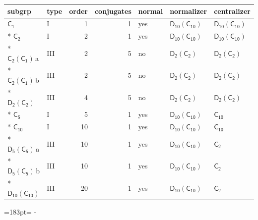 \documentclass[10pt,a4paper]{article}
\newcommand{\needspace}[1]{\par\penalty-100\begingroup\dimen0=#1\relax\dimen2=\pagegoal
  \advance\dimen2-\pagetotal\ifdim\dimen0>\dimen2\relax\ifdim\dimen2>0pt\vfil\break\fi\fi
  \endgroup}
\numberwithin{equation}{section}
\newcommand{\grp}[1]{\mathsf{#1}}
\newcommand{\clsletter}[1]{\,{\scriptsize\color{black!55}#1}}
\begin{document}
{\small\begin{longtable}{@{}llrrlll@{}}\toprule
subgrp & type & order & conjugates & normal & normalizer & centralizer\\\midrule\endhead
\bottomrule\endfoot\endlastfoot
\href{../../../rotation/data/pdf/C1.pdf}{$\grp{C_{1}}$} & I & 1 & 1 & yes & \href{D10-C10.pdf}{$\grp{D_{10}}(\grp{C_{10}})$} & \href{D10-C10.pdf}{$\grp{D_{10}}(\grp{C_{10}})$}\\*
\href{../../../rotation/data/pdf/C2.pdf}{$\grp{C_{2}}$} & I & 2 & 1 & yes & \href{D10-C10.pdf}{$\grp{D_{10}}(\grp{C_{10}})$} & \href{D10-C10.pdf}{$\grp{D_{10}}(\grp{C_{10}})$}\\*
\href{C2-C1.pdf}{$\grp{C_{2}}(\grp{C_{1}})$}\clsletter{a} & III & 2 & 5 & no & \href{D2-C2.pdf}{$\grp{D_{2}}(\grp{C_{2}})$} & \href{D2-C2.pdf}{$\grp{D_{2}}(\grp{C_{2}})$}\\*
\href{C2-C1.pdf}{$\grp{C_{2}}(\grp{C_{1}})$}\clsletter{b} & III & 2 & 5 & no & \href{D2-C2.pdf}{$\grp{D_{2}}(\grp{C_{2}})$} & \href{D2-C2.pdf}{$\grp{D_{2}}(\grp{C_{2}})$}\\*
\href{D2-C2.pdf}{$\grp{D_{2}}(\grp{C_{2}})$} & III & 4 & 5 & no & \href{D2-C2.pdf}{$\grp{D_{2}}(\grp{C_{2}})$} & \href{D2-C2.pdf}{$\grp{D_{2}}(\grp{C_{2}})$}\\*
\href{../../../rotation/data/pdf/C5.pdf}{$\grp{C_{5}}$} & I & 5 & 1 & yes & \href{D10-C10.pdf}{$\grp{D_{10}}(\grp{C_{10}})$} & \href{../../../rotation/data/pdf/C10.pdf}{$\grp{C_{10}}$}\\*
\href{../../../rotation/data/pdf/C10.pdf}{$\grp{C_{10}}$} & I & 10 & 1 & yes & \href{D10-C10.pdf}{$\grp{D_{10}}(\grp{C_{10}})$} & \href{../../../rotation/data/pdf/C10.pdf}{$\grp{C_{10}}$}\\*
\href{D5-C5.pdf}{$\grp{D_{5}}(\grp{C_{5}})$}\clsletter{a} & III & 10 & 1 & yes & \href{D10-C10.pdf}{$\grp{D_{10}}(\grp{C_{10}})$} & \href{../../../rotation/data/pdf/C2.pdf}{$\grp{C_{2}}$}\\*
\href{D5-C5.pdf}{$\grp{D_{5}}(\grp{C_{5}})$}\clsletter{b} & III & 10 & 1 & yes & \href{D10-C10.pdf}{$\grp{D_{10}}(\grp{C_{10}})$} & \href{../../../rotation/data/pdf/C2.pdf}{$\grp{C_{2}}$}\\*
\href{D10-C10.pdf}{$\grp{D_{10}}(\grp{C_{10}})$} & III & 20 & 1 & yes & \href{D10-C10.pdf}{$\grp{D_{10}}(\grp{C_{10}})$} & \href{../../../rotation/data/pdf/C2.pdf}{$\grp{C_{2}}$}\\
\bottomrule\end{longtable}}
\needspace{183pt}
\end{document}
